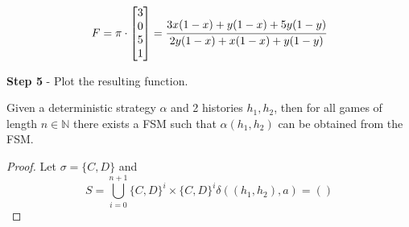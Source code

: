 \begin{equation}
F = \pi \cdot
\begin{bmatrix}
3 \\
0 \\
5 \\
1
\end{bmatrix}
=
\cfrac{3x(1-x) + y(1-x) + 5y(1-y)}{2y(1-x) + x(1-x) + y(1-y)}
\end{equation}

\textbf{Step 5} - Plot the resulting function. %






\begin{theorem}\label{thm:fsm}
Given a deterministic strategy $\alpha$ and 2 histories $h_1, h_2$, then for all games of length $n \in \mathbb{N}$ there exists a FSM such that $\alpha(h_1, h_2)$ can be obtained from the FSM.
\end{theorem}

\begin{proof}\label{prf:fsm}
Let $\sigma = \{C, D\}$ and
\[
S = \bigcup_{i=0}^{n+1} \{C, D\}^i \times \{C, D\}^i
\delta((h_1, h_2), a) =()
\]

\end{proof}
